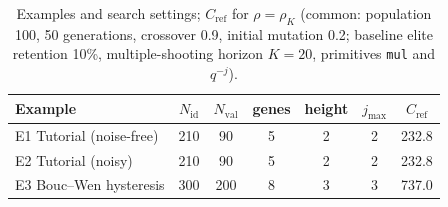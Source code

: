 \begin{table}[!htbp]
\centering
\caption{Examples and search settings; $C_\mathrm{ref}$ for $\rho=\rho_K$ (common: population 100, 50 generations, crossover 0.9, initial mutation 0.2; baseline elite retention 10\%, multiple-shooting horizon $K=20$, primitives \texttt{mul} and $q^{-j}$).}
\label{tab:setup_K}
\setlength{\tabcolsep}{4pt}
\begin{tabular}{lcccccc}
\toprule
Example & $N_\mathrm{id}$ & $N_\mathrm{val}$ & genes & height & $j_{\max}$ & $C_\mathrm{ref}$ \\
\midrule
E1 Tutorial (noise-free) & 210 & 90 & 5 & 2 & 2 & 232.8 \\
E2 Tutorial (noisy) & 210 & 90 & 5 & 2 & 2 & 232.8 \\
E3 Bouc--Wen hysteresis & 300 & 200 & 8 & 3 & 3 & 737.0 \\
\bottomrule
\end{tabular}
\end{table}
